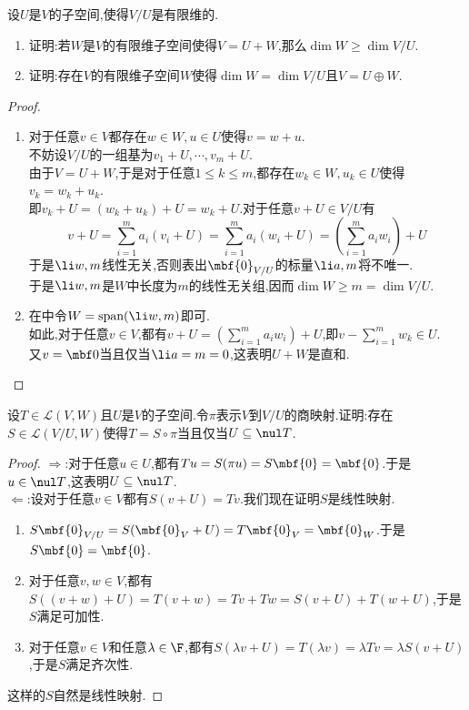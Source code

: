 \documentclass{ctexart}
\begin{document}
\begin{problem}[18.]
    设$U$是$V$的子空间,使得$V/U$是有限维的.
    \begin{enumerate}[label=\tbf{(\arabic*)}]
        \item 证明:若$W$是$V$的有限维子空间使得$V=U+W$,那么$\dim W\geqslant\dim V/U$.
        \item 证明:存在$V$的有限维子空间$W$使得$\dim W=\dim V/U$且$V=U\oplus W$.
    \end{enumerate}
\end{problem}
\begin{proof}
    \begin{enumerate}[label=\tbf{(\arabic*)}]
        \item 对于任意$v\in V$都存在$w\in W,u\in U$使得$v=w+u$.\\
            不妨设$V/U$的一组基为$v_1+U,\cdots,v_m+U$.\\
            由于$V=U+W$,于是对于任意$1\leqslant k\leqslant m$,都存在$w_k\in W,u_k\in U$使得$v_k=w_k+u_k$.\\
            即$v_k+U=(w_k+u_k)+U=w_k+U$.对于任意$v+U\in V/U$有
            $$v+U=\sum_{i=1}^{m}a_i(v_i+U)=\sum_{i=1}^{m}a_i(w_i+U)=\left(\sum_{i=1}^{m}a_iw_i\right)+U$$
            于是$\li w,m$线性无关,否则表出$\mbf{0}_{V/U}$的标量$\li a,m$将不唯一.\\
            于是$\li w,m$是$W$中长度为$m$的线性无关组,因而$\dim W\geqslant m=\dim V/U$.
        \item 在中令$W=\text{span}(\li w,m)$即可.\\
            如此,对于任意$v\in V$,都有$\displaystyle v+U=\left(\sum_{i=1}^{m}a_iw_i\right)+U$,即$\displaystyle v-\sum_{i=1}^{m}w_k\in U$.\\
            又$v=\mbf0$当且仅当$\li a=m=0$,这表明$U+W$是直和.
    \end{enumerate}
\end{proof}
\begin{problem}[19.]
    设$T\in\mathcal{L}(V,W)$且$U$是$V$的子空间.令$\pi$表示$V$到$V/U$的商映射.证明:存在$S\in\mathcal{L}(V/U,W)$使得$T=S\circ\pi$当且仅当$U\subseteq\nul T$.
\end{problem}
\begin{proof}
    $\Rightarrow$:对于任意$u\in U$,都有$Tu=S(\pi u)=S\mbf{0}=\mbf{0}$.于是$u\in\nul T$,这表明$U\subseteq\nul T$.\\
    $\Leftarrow$:设对于任意$v\in V$都有$S(v+U)=Tv$.我们现在证明$S$是线性映射.
    \begin{enumerate}[label=\tbf{(\alph*)}]
        \item $S\mbf{0}_{V/U}=S(\mbf{0}_V+U)=T\mbf{0}_V=\mbf{0}_W$.于是$S\mbf{0}=\mbf{0}$.
        \item 对于任意$v,w\in V$,都有$S((v+w)+U)=T(v+w)=Tv+Tw=S(v+U)+T(w+U)$,于是$S$满足可加性.
        \item 对于任意$v\in V$和任意$\lambda\in\F$,都有$S(\lambda v+U)=T(\lambda v)=\lambda Tv=\lambda S(v+U)$,于是$S$满足齐次性.
    \end{enumerate}
    这样的$S$自然是线性映射.
\end{proof}
\end{document}
